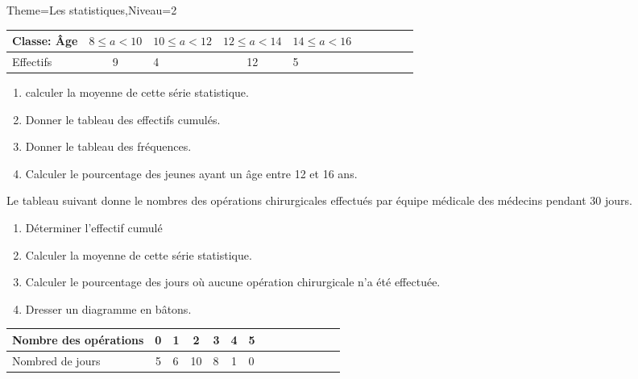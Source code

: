 \documentclass[a4paper,12pt]{article}
\begin{document}
\begin{Maquette}[Fiche]{Theme=Les statistiques,Niveau=2}
\begin{exercice}
\begin{tabular}{|Oc|Oc|Oc|Oc|Oc|}
\hline 
Classe: Âge & $8\leq a <10$ & $10\leq a<12$ & $12\leq a<14$ & $14\leq a<16$ \\ 
\hline 
Effectifs & 9 & 4 & 12 & 5 \\ 
\hline 
\end{tabular}
\begin{enumerate}
\item calculer la moyenne de cette série statistique.
\item Donner le tableau des effectifs cumulés.
\item Donner le tableau des fréquences.
\item Calculer le pourcentage des jeunes ayant un âge entre 12 et 16 ans.
\end{enumerate}
\end{exercice}

\begin{exercice}
Le tableau suivant donne le nombres des opérations chirurgicales effectués par équipe médicale des médecins pendant 30 jours.

\begin{minipage}{0.5\linewidth}
\begin{enumerate}
\item Déterminer l'effectif cumulé 
\item Calculer la moyenne de cette série statistique.
\item Calculer le pourcentage des jours où aucune opération chirurgicale n'a été effectuée.
\item Dresser un diagramme en bâtons.
\end{enumerate}
\end{minipage}%
\begin{minipage}{0.5\linewidth}
\begin{tabular}{|Oc|Oc|Oc|Oc|Oc|Oc|Oc|}
\hline 
Nombre des opérations & 0 & 1 & 2 & 3 & 4 & 5 \\ 
\hline 
Nombred de jours & 5 & 6 & 10 & 8 & 1 & 0 \\ 
\hline 
\end{tabular}
\end{minipage}
 \end{exercice}
\newpage


\end{Maquette}
\end{document}
